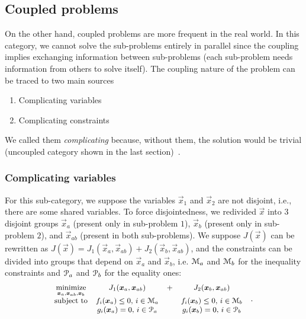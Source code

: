 \documentclass[../main.tex]{subfiles}
\begin{document}
\newpage
\subsection{Coupled problems}\label{sec:coupled_problems}
On the other hand, coupled problems are more frequent in the real world.
In this category, we cannot solve the sub-problems
entirely in parallel since the coupling implies exchanging information between sub-problems (each sub-problem needs information from others to solve itself).
The coupling nature of the problem can be traced to two main sources
\begin{enumerate}
  \item Complicating variables
  \item Complicating constraints
\end{enumerate}
We called them \emph{complicating} because, without them, the solution would be trivial (uncoupled category shown in the last section)~\cite{ConejoEtAl2006}.

\subsubsection{Complicating variables}
For this sub-category, we suppose the variables $\vec{x}_{1}$ and $\vec{x}_{2}$ are not disjoint, i.e., there are some shared variables.
To force disjointedness, we redivided $\vec{x}$ into $3$ disjoint groups $\vec{x}_{a}$ (present only in sub-problem $1$), $\vec{x}_{b}$ (present only in sub-problem $2$), and $\vec{x}_{ab}$ (present in both sub-problems).
We suppose $J(\vec{x})$ can be rewritten  as ${J(\vec{x})=J_{1}(\vec{x}_{a},\vec{x}_{ab})+J_{2}(\vec{x}_{b},\vec{x}_{ab})}$, and the constraints can be divided into groups that depend on $\vec{x}_{a}$ and $\vec{x}_{b}$, i.e. $\mathcal{M}_{a}$ and $\mathcal{M}_{b}$ for the inequality constraints and $\mathcal{P}_{a}$ and $\mathcal{P}_{b}$ for the equality ones:
\begin{equation}\label{eq:general_complicating_variables_optimization_problem}
  \small
  \begin{aligned}
    \begin{matrix}
      \mathop{\textrm{minimize}}\limits_{\boldsymbol{x}_{a},\boldsymbol{x}_{ab},\boldsymbol{x}_{b}}  &J_{1}(\boldsymbol{x}_{a},\boldsymbol{x}_{ab})&+&J_{2}(\boldsymbol{x}_{b},\boldsymbol{x}_{ab})&\\
      \mathrm{subject~ to} &

      f_{i}(\boldsymbol{x}_{a}) \leq 0 \text{, } i\in\mathcal{M}_{a} & & f_{i}(\boldsymbol{x}_{b}) \leq 0 \text{, } i\in\mathcal{M}_{b}\\
      & g_{i}(\boldsymbol{x}_{a}) = 0\text{, } i\in\mathcal{P}_{a}& & g_{i}(\boldsymbol{x}_{b}) = 0\text{, } i\in\mathcal{P}_{b}\\
    \end{matrix}
  \end{aligned}.
\end{equation}
\end{document}
